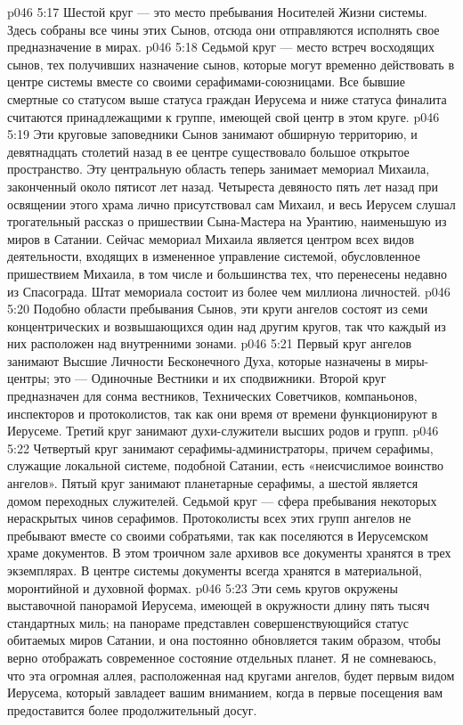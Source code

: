 \vs p046 5:17 Шестой круг --- это место пребывания Носителей Жизни системы. Здесь собраны все чины этих Сынов, отсюда они отправляются исполнять свое предназначение в мирах.
\vs p046 5:18 Седьмой круг --- место встреч восходящих сынов, тех получивших назначение сынов, которые могут временно действовать в центре системы вместе со своими серафимами\hyp{}союзницами. Все бывшие смертные со статусом выше статуса граждан Иерусема и ниже статуса финалита считаются принадлежащими к группе, имеющей свой центр в этом круге.
\vs p046 5:19 Эти круговые заповедники Сынов занимают обширную территорию, и девятнадцать столетий назад в ее центре существовало большое открытое пространство. Эту центральную область теперь занимает мемориал Михаила, законченный около пятисот лет назад. Четыреста девяносто пять лет назад при освящении этого храма лично присутствовал сам Михаил, и весь Иерусем слушал трогательный рассказ о пришествии Сына\hyp{}Мастера на Урантию, наименьшую из миров в Сатании. Сейчас мемориал Михаила является центром всех видов деятельности, входящих в измененное управление системой, обусловленное пришествием Михаила, в том числе и большинства тех, что перенесены недавно из Спасограда. Штат мемориала состоит из более чем миллиона личностей.
\vs p046 5:20 \pc {}\bibnobreakspace {} Подобно области пребывания Сынов, эти круги ангелов состоят из семи концентрических и возвышающихся один над другим кругов, так что каждый из них расположен над внутренними зонами.
\vs p046 5:21 \pc Первый круг ангелов занимают Высшие Личности Бесконечного Духа, которые назначены в миры\hyp{}центры; это --- Одиночные Вестники и их сподвижники. Второй круг предназначен для сонма вестников, Технических Советчиков, компаньонов, инспекторов и протоколистов, так как они время от времени функционируют в Иерусеме. Третий круг занимают духи\hyp{}служители высших родов и групп.
\vs p046 5:22 Четвертый круг занимают серафимы\hyp{}администраторы, причем серафимы, служащие локальной системе, подобной Сатании, есть «неисчислимое воинство ангелов». Пятый круг занимают планетарные серафимы, а шестой является домом переходных служителей. Седьмой круг --- сфера пребывания некоторых нераскрытых чинов серафимов. Протоколисты всех этих групп ангелов не пребывают вместе со своими собратьями, так как поселяются в Иерусемском храме документов. В этом троичном зале архивов все документы хранятся в трех экземплярах. В центре системы документы всегда хранятся в материальной, моронтийной и духовной формах.
\vs p046 5:23 Эти семь кругов окружены выставочной панорамой Иерусема, имеющей в окружности длину пять тысяч стандартных миль; на панораме представлен совершенствующийся статус обитаемых миров Сатании, и она постоянно обновляется таким образом, чтобы верно отображать современное состояние отдельных планет. Я не сомневаюсь, что эта огромная аллея, расположенная над кругами ангелов, будет первым видом Иерусема, который завладеет вашим вниманием, когда в первые посещения вам предоставится более продолжительный досуг.
